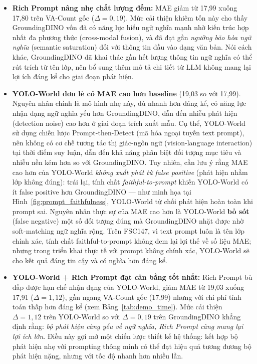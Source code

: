 \documentclass[a4paper,12pt]{report}
\numberwithin{figure}{chapter}
\numberwithin{table}{chapter}
\begin{document}
\begin{itemize}
    \item \textbf{Rich Prompt nâng nhẹ chất lượng đếm:} MAE giảm từ 17,99 xuống 17,80 trên VA-Count gốc ($\Delta = 0{,}19$). Mức cải thiện khiêm tốn này cho thấy GroundingDINO vốn đã có năng lực hiểu ngữ nghĩa mạnh nhờ kiến trúc hợp nhất đa phương thức (cross-modal fusion), và đã đạt gần \emph{ngưỡng bão hòa ngữ nghĩa} (semantic saturation) đối với thông tin đầu vào dạng văn bản. Nói cách khác, GroundingDINO đã khai thác gần hết lượng thông tin ngữ nghĩa có thể rút trích từ tên lớp, nên bổ sung thêm mô tả chi tiết từ LLM không mang lại lợi ích đáng kể cho giai đoạn phát hiện.

    \item \textbf{YOLO-World đơn lẻ có MAE cao hơn baseline} (19,03 so với 17,99). Nguyên nhân chính là mô hình nhẹ này, dù nhanh hơn đáng kể, có năng lực nhận dạng ngữ nghĩa yếu hơn GroundingDINO, dẫn đến nhiễu phát hiện (detection noise) cao hơn ở giai đoạn trích xuất mẫu. Cụ thể, YOLO-World sử dụng chiến lược Prompt-then-Detect (mã hóa ngoại tuyến text prompt), nên không có cơ chế tương tác thị giác-ngôn ngữ (vision-language interaction) tại thời điểm suy luận, dẫn đến khả năng phân biệt đối tượng mục tiêu và nhiễu nền kém hơn so với GroundingDINO. Tuy nhiên, cần lưu ý rằng MAE cao hơn của YOLO-World \emph{không xuất phát từ false positive} (phát hiện nhầm lớp không đúng): trái lại, tính chất \textit{faithful-to-prompt} khiến YOLO-World có ít false positive hơn GroundingDINO --- như minh họa tại Hình~\ref{fig:prompt_faithfulness}, YOLO-World từ chối phát hiện hoàn toàn khi prompt sai. Nguyên nhân thực sự của MAE cao hơn là YOLO-World \textbf{bỏ sót} (false negative) một số đối tượng đúng mà GroundingDINO nhặt được nhờ soft-matching ngữ nghĩa rộng. Trên FSC147, vì text prompt luôn là tên lớp chính xác, tính chất faithful-to-prompt không đem lại lợi thế về số liệu MAE; nhưng trong triển khai thực tế với prompt không chính xác, YOLO-World sẽ cho kết quả đáng tin cậy và có nghĩa hơn đáng kể.

    \item \textbf{YOLO-World + Rich Prompt đạt cân bằng tốt nhất:} Rich Prompt bù đắp được hạn chế nhận dạng của YOLO-World, giảm MAE từ 19,03 xuống 17,91 ($\Delta = 1{,}12$), gần ngang VA-Count gốc (17,99) nhưng với chi phí tính toán thấp hơn đáng kể (xem Bảng~\ref{tab:demo_time}). Mức cải thiện $\Delta = 1{,}12$ trên YOLO-World so với $\Delta = 0{,}19$ trên GroundingDINO khẳng định rằng: \emph{bộ phát hiện càng yếu về ngữ nghĩa, Rich Prompt càng mang lại lợi ích lớn}. Điều này gợi mở một chiến lược thiết kế hệ thống: kết hợp bộ phát hiện nhẹ với prompting thông minh có thể đạt hiệu quả tương đương bộ phát hiện nặng, nhưng với tốc độ nhanh hơn nhiều lần.
\end{itemize}
\end{document}
